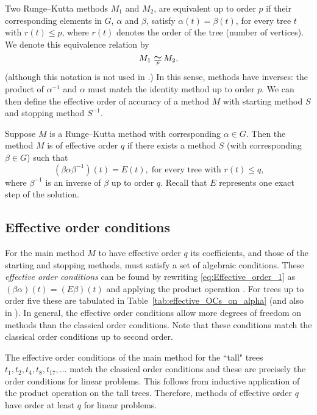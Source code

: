 Two Runge--Kutta methods $M_1$ and $M_2$, are equivalent up to order
$p$ if their corresponding elements in $G$, $\alpha$ and $\beta$, satisfy
$\alpha(t) = \beta(t)$, for every tree $t$ with $r(t) \leq p$,
where $r(t)$ denotes the order of the tree (number of vertices).
We denote this equivalence relation by
$$M_1 \equival{p} M_2,$$
(although this notation is not used in \cite{Butcher2008_book}.)
In this sense, methods have inverses: the product of $\alpha^{-1}$ and
$\alpha$ must match the identity method up to order $p$.
We can then define the effective order of accuracy of a method $M$
with starting method $S$ and stopping method $S^{-1}$. %
\begin{definition}\cite[Section~389]{Butcher2008_book}\label{def:Effective_order}
  Suppose $M$ is a Runge--Kutta method with corresponding $\alpha \in G$.
  Then the method $M$ is of effective order $q$ if there exists a method
  $S$ (with corresponding $\beta \in G$) such that
	\begin{equation}\label{eq:Effective_order_1}
		(\beta\alpha\beta^{-1})(t) = E(t), \; \text{for every tree with $r(t) \leq q$,}
	\end{equation}
        where $\beta^{-1}$ is an inverse of $\beta$ up to order $q$.
        Recall that $E$ represents one exact step of the solution.
\end{definition}

\subsection{Effective order conditions}\label{sec:effOrderCond}
For the main method $M$ to have effective order $q$ its coefficients,
and those of the starting and stopping methods, must satisfy a set of
algebraic conditions.
These \emph{effective order conditions} can be found
by rewriting \eqref{eq:Effective_order_1} as
$(\beta\alpha)(t) = (E\beta)(t)$  %
and applying the product operation \cite{Butcher2008_book}.
For trees up to order five these are tabulated in Table~\ref{tab:effective_OCs_on_alpha} (and also in \cite[Sec~389]{Butcher2008_book}).
In general, the effective order conditions allow more degrees of
freedom on methods than the classical order conditions.
Note that these conditions match the classical order conditions up to
second order.
\begin{remark}\label{rem:talltrees}
	The effective order conditions of the main method for the ``tall" trees 
	$t_1, t_2, t_4, t_8, t_{17}, \dots$ match the classical order conditions
	and these are precisely the order conditions for linear problems.
	This follows from inductive application of the product operation \cite{Butcher2008_book}
	on the tall trees.  Therefore, methods of effective order $q$ have order at least
        $q$ for linear problems.
\end{remark}

